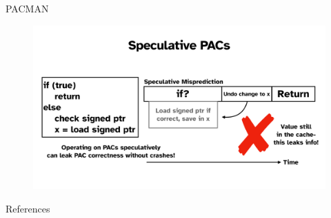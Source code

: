 \documentclass{beamer}
\begin{document}
\begin{frame}{PACMAN\cite{pacman}}
    \begin{figure}
        \begin{center}
            \includegraphics[width=1\textwidth]{img/pacman.pdf}
        \end{center}
    \end{figure} 
\end{frame}

\begin{frame}[allowframebreaks]{References}
\tiny
\printbibliography
\end{frame}
\end{document}
